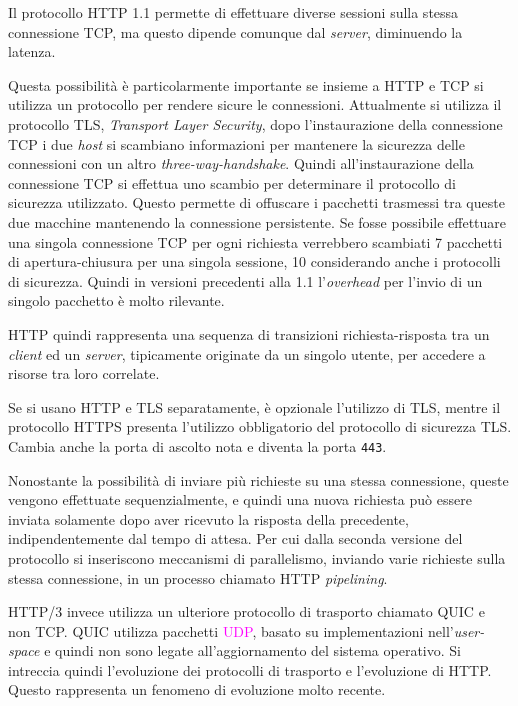 \documentclass{article}
\numberwithin{equation}{subsection}
\begin{document}
Il protocollo \textcolor{NavyBlue}{HTTP} 1.1 permette di effettuare diverse sessioni sulla stessa 
connessione \textcolor{Bittersweet}{TCP}, ma questo dipende comunque dal \textit{server}, diminuendo la latenza. 

Questa possibilità è particolarmente importante se insieme a \textcolor{NavyBlue}{HTTP} e \textcolor{Bittersweet}{TCP} si 
utilizza un protocollo per rendere sicure le connessioni. Attualmente si utilizza il 
protocollo TLS, \textit{Transport Layer Security}, dopo l'instaurazione della 
connessione \textcolor{Bittersweet}{TCP} i due \textit{host} si scambiano informazioni per mantenere la sicurezza delle connessioni con un altro \textit{three-way-handshake}. Quindi all'instaurazione della connessione \textcolor{Bittersweet}{TCP} si effettua uno 
scambio per determinare il protocollo di sicurezza utilizzato. Questo permette di offuscare i pacchetti trasmessi tra queste due macchine mantenendo la connessione 
persistente. 
Se fosse possibile effettuare una singola connessione \textcolor{Bittersweet}{TCP} per ogni richiesta verrebbero scambiati 7 pacchetti di apertura-chiusura per una singola sessione, 10 considerando anche i protocolli di sicurezza. Quindi in versioni precedenti alla 1.1 l'\textit{overhead} per l'invio di un singolo pacchetto è molto rilevante.   

\textcolor{NavyBlue}{HTTP} quindi rappresenta una sequenza di transizioni richiesta-risposta tra un \textit{client} ed un \textit{server}, tipicamente originate da un singolo utente, per accedere a risorse tra loro correlate. 

Se si usano \textcolor{NavyBlue}{HTTP} e TLS separatamente, è opzionale l'utilizzo di TLS, mentre il protocollo HTTPS presenta l'utilizzo obbligatorio del protocollo di sicurezza TLS. Cambia anche la porta di ascolto nota e diventa la porta \texttt{443}. 

Nonostante la possibilità di inviare più richieste su una stessa connessione, queste vengono effettuate sequenzialmente, e quindi una nuova richiesta può essere inviata solamente dopo aver ricevuto la risposta della precedente, indipendentemente dal tempo di attesa. Per cui dalla seconda versione del protocollo si inseriscono meccanismi di parallelismo, inviando varie richieste sulla stessa connessione, in un processo chiamato \textcolor{NavyBlue}{HTTP} \textit{pipelining}. 

\textcolor{NavyBlue}{HTTP}/3 invece utilizza un ulteriore protocollo di trasporto chiamato QUIC e non \textcolor{Bittersweet}{TCP}. QUIC utilizza pacchetti \textcolor{Fuchsia}{UDP}, basato su implementazioni nell'\textit{user-space} e quindi 
non sono legate all'aggiornamento del sistema operativo. 
Si intreccia quindi l'evoluzione dei protocolli di trasporto e l'evoluzione di \textcolor{NavyBlue}{HTTP}. 
Questo rappresenta un fenomeno di evoluzione molto recente. 
\end{document}
